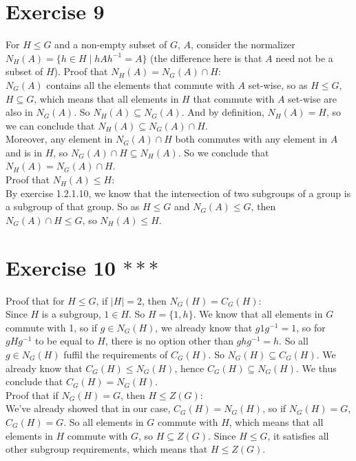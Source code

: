 \documentclass{article}
\begin{document}
    \section*{Exercise 9}
    For $H \leqslant G$ and a non-empty subset of $G$, $A$,
    consider the normalizer $N_H(A) = \{ h \in H \mid hAh^{-1} = A \}$
    (the difference here is that $A$ need not be a subset of $H$).
    Proof that $N_H(A) = N_G(A) \cap H$: \\
    $N_G(A)$ contains all the elements that commute with $A$ set-wise,
    so as $H \leqslant G$, $H \subseteq G$,
    which means that all elements in $H$ that commute with $A$ set-wise
    are also in $N_G(A)$.
    So $N_H(A) \subseteq N_G(A)$.
    And by definition, $N_H(A) = H$,
    so we can conclude that $N_H(A) \subseteq N_G(A) \cap H$. \\
    Moreover, any element in $N_G(A) \cap H$ both commutes with any element
    in $A$ and is in $H$, so $N_G(A) \cap H \subseteq N_H(A)$.
    So we conclude that $N_H(A) = N_G(A) \cap H$. \\
    Proof that $N_H(A) \leqslant H$: \\
    By exercise 1.2.1.10, we know that the intersection of two
    subgroups of a group is a subgroup of that group.
    So as $H \leqslant G$ and $N_G(A) \leqslant G$,
    then $N_G(A) \cap H \leqslant G$,
    so $N_H(A) \leqslant H$.


    \section*{Exercise 10 $***$}
    Proof that for $H \leqslant G$, if $|H| = 2$, then $N_G(H) = C_G(H)$: \\
    Since $H$ is a subgroup, $1 \in H$.
    So $H = \{1, h\}$.
    We know that all elements in $G$ commute with 1,
    so if $g \in N_G(H)$, we already know that $g1g^{-1} = 1$,
    so for $gHg^{-1}$ to be equal to $H$,
    there is no option other than $ghg^{-1} = h$.
    So all $g \in N_G(H)$ fuffil the requirements of $C_G(H)$.
    So $N_G(H) \subseteq C_G(H)$.
    We already know that $C_G(H) \leqslant N_G(H)$,
    hence $C_G(H) \subseteq N_G(H)$.
    We thus conclude that $C_G(H) = N_G(H)$. \\
    Proof that if $N_G(H) = G$, then $H \leqslant Z(G)$: \\
    We've already showed that in our case, $C_G(H) = N_G(H)$,
    so if $N_G(H) = G$, $C_G(H) = G$.
    So all elements in $G$ commute with $H$,
    which means that all elements in $H$ commute with $G$,
    so $H \subseteq Z(G)$.
    Since $H \leqslant G$, it satisfies all other subgroup requirements,
    which means that $H \leqslant Z(G)$.
\end{document}
